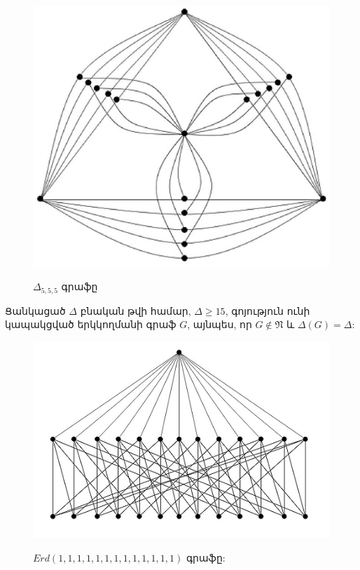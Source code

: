 \begin{hide}
\begin{figure}[h]
\begin{center}
\includegraphics[width=30pc]{figures/shannon555.eps}\\
\caption{$\Delta_{5,5,5}$ գրաֆը}\label{f3_Shannon555}
\end{center}
\end{figure}

\begin{corollary}
\label{c3_Shannon} Ցանկացած $\Delta$ բնական թվի համար, $\Delta \geq 15$,
գոյություն ունի կապակցված երկկողմանի գրաֆ $G$, այնպես, որ $G\notin \mathfrak{N}$
և $\Delta(G)=\Delta$:
\end{corollary}

\begin{figure}[t]
\begin{center}
\includegraphics[width=30pc]{figures/erd13.jpg}\\
\caption{$Erd(1,1,1,1,1,1,1,1,1,1,1,1,1)$ գրաֆը:}\label{f3_Erd}
\end{center}
\end{figure}


\end{hide}
